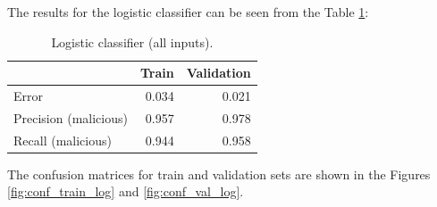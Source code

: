 \documentclass[11pt,a4paper]{article}
\begin{document}
The results for the logistic classifier can be seen from the Table \ref{tab:results-log}:

\begin{table}[H]
	\centering
	\begin{tabular}{lrr}
		\toprule
		& \textbf{Train} & \textbf{Validation}  \\ \midrule
		Error & 0.034 & 0.021 \\	
		Precision (malicious) & 0.957 & 0.978 \\
		Recall (malicious) & 0.944 & 0.958 \\
		\bottomrule
	\end{tabular}
	\caption{Logistic classifier (all inputs).}
	\label{tab:results-log}
\end{table}

The confusion matrices for train and validation sets are shown in the Figures \ref{fig:conf_train_log} and \ref{fig:conf_val_log}.
\end{document}
